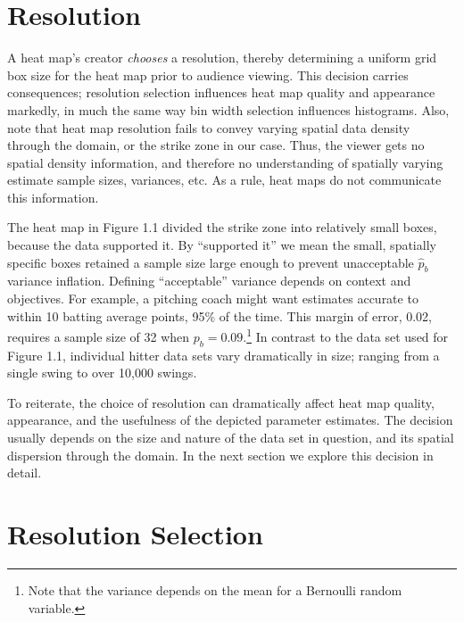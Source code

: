 \section{Resolution} %

A heat map's creator {\it chooses} a resolution, thereby determining a uniform grid box size for the heat map prior to audience viewing. This decision carries consequences; resolution selection influences heat map quality and appearance markedly, in much the same way bin width selection influences histograms. Also, note that heat map resolution fails to convey varying spatial data density through the domain, or the strike zone in our case. Thus, the viewer gets no spatial density information, and therefore no understanding of spatially varying estimate sample sizes, variances, etc. As a rule, heat maps do not communicate this information.

The heat map in Figure 1.1 divided the strike zone into relatively small boxes, because the data supported it. By ``supported it'' we mean the small, spatially specific boxes retained a sample size large enough to prevent unacceptable $\hat{p}_{b}$ variance inflation. Defining ``acceptable'' variance depends on context and objectives. For example, a pitching coach might want estimates accurate to within 10 batting average points, 95\% of the time. This margin of error, 0.02, requires a sample size of 32 when $p_{b} = 0.09$.\footnote{Note that the variance depends on the mean for a Bernoulli random variable.} In contrast to the data set used for Figure 1.1, individual hitter data sets vary dramatically in size; ranging from a single swing to over 10,000 swings. 

To reiterate, the choice of resolution can dramatically affect heat map quality, appearance, and the usefulness of the depicted parameter estimates. The decision usually depends on the size and nature of the data set in question, and its spatial dispersion through the domain. In the next section we explore this decision in detail.

\section{Resolution Selection}

